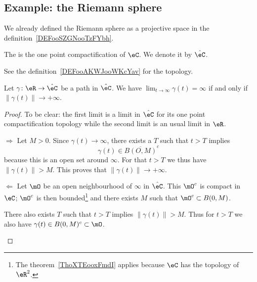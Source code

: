 \subsection{Example: the Riemann sphere}
\label{SEBSECooLJSEooNlyFYv}

We already defined the Riemann sphere as a projective space in the definition~\ref{DEFooSZGNooTzFYbh}.

\begin{definition}      \label{DEFooMAHAooGUYyqU}
    The  is the one point compactification of \( \eC\). We denote it by \( \hat \eC\).
\end{definition}
See the definition~\ref{DEFooAKWJooWKcYav} for the topology.

\begin{proposition}     \label{PROPooDTPKooYcSzYq}
    Let \( \gamma\colon \eR\to \hat \eC\) be a path in \( \hat \eC\). We have \( \lim_{t\to \infty} \gamma(t)=\infty\) if and only if \( \| \gamma(t) \|\to +\infty\).
\end{proposition}

\begin{proof}
    To be clear: the first limit is a limit in \( \hat \eC\) for its one point compactification topology while the second limit is an usual limit in \( \eR\).
    \begin{subproof}
    \item[\( \Rightarrow\)]
        Let \( M>0\). Since \( \gamma(t)\to \infty\), there exists a \( T\) such that \( t>T\) implies
        \begin{equation}
            \gamma(t)\in\overline{ B(O,M) }^c
        \end{equation}
        because this is an open set around \( \infty\). For that \( t>T\) we thus have \( \| \gamma(t) \|>M\). This proves that \( \| \gamma(t) \|\to +\infty\).
    \item[\( \Leftarrow\)]
        Let \( \mO\) be an open neighbourhood of \( \infty\) in \( \hat \eC\). This \( \mO^c\) is compact in \( \eC\); \( \mO^c\) is then bounded\footnote{The theorem~\ref{ThoXTEooxFmdI} applies because \( \eC\) has the topology of \( \eR^2\).} and there exists \( M\) such that \( \mO^c\subset B(0,M)\).

        There also exists \( T\) such that \( t>T\) implies \( \| \gamma(t) \|>M\). Thus for \( t>T\) we also have \( \gamma(t)\in B(0,M)^c\subset \mO\).
    \end{subproof}
\end{proof}

